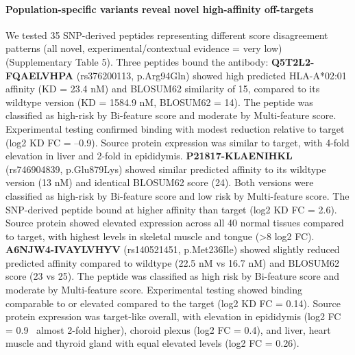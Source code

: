 \documentclass[times, twoside, watermark]{zHenriquesLab-StyleBioRxiv}
\begin{document}
        \paragraph{Population-specific variants reveal novel high-affinity off-targets}\label{results:validation_snp} 
            We tested 35 SNP-derived peptides representing different score disagreement patterns (all novel, experimental/contextual evidence = very low) (Supplementary Table 5). Three peptides bound the antibody:
            \textbf{Q5T2L2-FQAELVHPA} (rs376200113, p.Arg94Gln) showed high predicted HLA-A*02:01 affinity (KD = 23.4 nM) and BLOSUM62 similarity of 15, compared to its wildtype version (KD = 1584.9 nM, BLOSUM62 = 14). The peptide was classified as high-risk by Bi-feature score and moderate by Multi-feature score. Experimental testing confirmed binding with modest reduction relative to target (log2 KD FC = –0.9). Source protein expression was similar to target, with 4-fold elevation in liver and 2-fold in epididymis.
            \textbf{P21817-KLAENIHKL} (rs746904839, p.Glu879Lys) showed similar predicted affinity to its wildtype version (13 nM) and identical BLOSUM62 score (24). Both versions were classified as high-risk by Bi-feature score and low risk by Multi-feature score. The SNP-derived peptide bound at higher affinity than target (log2 KD FC = 2.6). Source protein showed elevated expression across all 40 normal tissues compared to target, with highest levels in skeletal muscle and tongue (>8 log2 FC).
            \textbf{A6NJW4-IVAYLVHYV} (rs140521451, p.Met236Ile) showed slightly reduced predicted affinity compared to wildtype (22.5 nM vs 16.7 nM) and BLOSUM62 score (23 vs 25). The peptide was classified as high risk by Bi-feature score and moderate by Multi-feature score. Experimental testing showed binding comparable to or elevated compared to the  target (log2 KD FC = 0.14). Source protein expression was target-like overall, with elevation in epididymis (log2 FC = 0.9 ~almost 2-fold higher), choroid plexus (log2 FC = 0.4), and liver, heart muscle and thyroid gland with equal elevated levels (log2 FC = 0.26).
\end{document}
